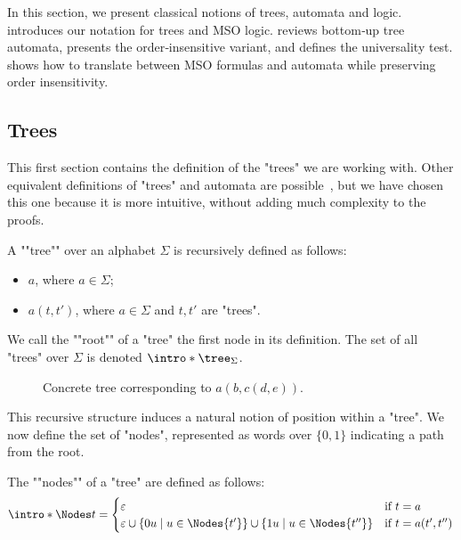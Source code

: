\documentclass[a4paper,UKenglish,cleveref, autoref, thm-restate]{lipics-v2021}
\begin{document}
In this section, we present classical notions of trees, automata and logic.
 introduces our notation for trees and MSO logic.
 reviews bottom‐up tree automata, presents the order‐insensitive variant, and defines the universality test.
 shows how to translate between MSO formulas and automata while preserving order insensitivity.


\subsection{Trees}\label{sec:trees}

This first section contains the definition of the "trees" we are working with. Other equivalent definitions of "trees" and
automata are possible~\cite{Thomas1997, tata}, but we have chosen this one because it is more intuitive, without adding much complexity to the proofs.

\begin{definition}["Tree"]
	\AP A ""tree"" over an alphabet $\Sigma$ is recursively defined as follows:
	\begin{itemize}
		\item $a$, where $a \in \Sigma$;
		\item $a(t,t')$, where $a \in \Sigma$ and $t, t'$ are "trees".
	\end{itemize}
	We call the ""root"" of a "tree" the first node in its definition.
	The set of all "trees" over $\Sigma$ is denoted $\intro* \tree_{\Sigma}$.
\end{definition}

\begin{figure}[h]
	\centering


	\caption{Concrete tree corresponding to $a(b, c(d, e))$.}
\end{figure}

This recursive structure induces a natural notion of position within a "tree". We now define the set of "nodes",
represented as words over $\{0,1\}$ indicating a path from the root.

\begin{definition}["Nodes"]
	\AP The ""nodes"" of a "tree" are defined as follows:
	\[
		\intro* \Nodes t =
		\begin{cases}
			\varepsilon                             & \text{if } t = a         \\
			\varepsilon \cup \setdef {0u} {u \in \Nodes {t'}}
			\cup \setdef {1u} {u \in \Nodes {t''} } & \text{if } t = a(t',t'')
		\end{cases}
	\]
\end{definition}
\end{document}
